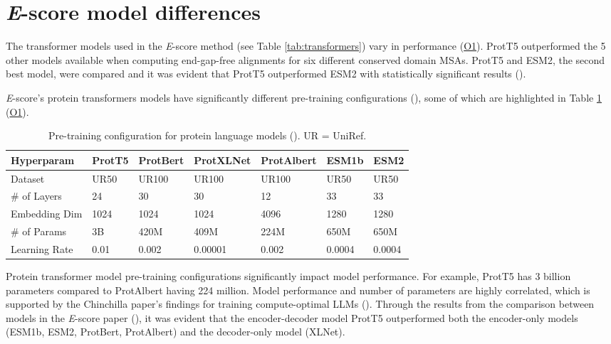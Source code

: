 \section{\textit{E}-score model differences}
The \gls{transformer} models used in the \textit{E}-score method (see Table \ref{tab:transformers}) vary in performance (\hyperlink{O1}{O1}). ProtT5 outperformed the 5 other models available when computing end-gap-free alignments for six different conserved domain \glspl{MSA}. ProtT5 and ESM2, the second best model, were compared and it was evident that ProtT5 outperformed ESM2 with statistically significant results (\cite{Ashrafzadeh:2023}).

\textit{E}-score's protein transformers models have significantly different pre-training configurations (\cite{Elnaggar:2021, Rives:2021}), some of which are highlighted in Table \ref{tab:prottrans} (\hyperlink{O1}{O1}).

\begin{table} %
	\caption{Pre-training configuration for protein language models (\cite{Elnaggar:2021,Rives:2021}). UR = UniRef.}
	\centering
	\begin{tabular}{ lllllll }
		\toprule
		Hyperparam & ProtT5 & ProtBert & ProtXLNet & ProtAlbert & ESM1b & ESM2 \\
		\midrule
		Dataset & UR50 & UR100 & UR100 & UR100 & UR50 & UR50 \\
		\# of Layers & 24 & 30 & 30 & 12 & 33 & 33 \\
		Embedding Dim & 1024 & 1024 & 1024 & 4096 & 1280 & 1280 \\
        \# of Params & 3B & 420M & 409M & 224M & 650M & 650M \\
        Learning Rate & 0.01 & 0.002 & 0.00001 & 0.002 & 0.0004 & 0.0004 \\
		\bottomrule
	\end{tabular}
	\label{tab:prottrans}
\end{table}

Protein transformer model pre-training configurations significantly impact model performance. For example, ProtT5 has 3 billion parameters compared to ProtAlbert having 224 million. Model performance and number of parameters are highly correlated, which is supported by the Chinchilla paper's findings for training compute-optimal \glspl{LLM} (\cite{Hoffman:2022}). Through the results from the comparison between models in the \textit{E}-score paper (\cite{Ashrafzadeh:2023}), it was evident that the encoder-decoder model ProtT5 outperformed both the encoder-only models (ESM1b, ESM2, ProtBert, ProtAlbert) and the decoder-only model (XLNet).


